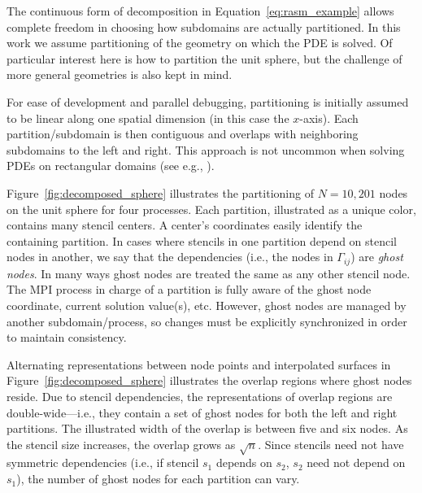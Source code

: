 \documentclass{report}
\begin{document}
The continuous form of decomposition in Equation~\ref{eq:rasm_example} allows complete freedom in choosing how subdomains are actually partitioned. In this work we assume partitioning of the geometry on which the PDE is solved. Of particular interest here is how to partition the unit sphere, but the challenge of more general geometries is also kept in mind. 

For ease of development and parallel debugging, partitioning is initially
assumed to be linear along one spatial dimension (in this case the $x$-axis). Each partition/subdomain is then contiguous and overlaps with neighboring subdomains to the left and right. This approach is not uncommon when solving PDEs on rectangular domains (see e.g., \cite{Divo2007, Thibault2009}). 


Figure~\ref{fig:decomposed_sphere} illustrates the partitioning of
$N=10,201$ nodes on the unit sphere for four processes. 
Each partition, illustrated as a unique color, contains many stencil centers.  
A center's coordinates easily identify the containing partition. In cases where stencils in one partition depend on stencil nodes in another, we say that the dependencies (i.e., the nodes in $\Gamma_{ij}$) are \emph{ghost nodes}. 
In many ways ghost nodes are treated the same as any other stencil node. The MPI process in charge of a partition is fully aware of the ghost node coordinate, current solution value(s), etc. However, ghost nodes are managed by another subdomain/process, so changes must be explicitly synchronized in order to maintain consistency. 

Alternating representations between node points and interpolated surfaces in Figure~\ref{fig:decomposed_sphere} illustrates the
overlap regions where ghost nodes reside. Due to stencil dependencies, the representations of overlap regions are double-wide---i.e., they contain a set of ghost nodes for both the left and right partitions. The illustrated width of the overlap is between five and six nodes. As the stencil size increases, the overlap grows as $\sqrt{n}$. Since stencils need not have symmetric dependencies (i.e., if stencil $s_1$ depends on $s_2$, $s_2$ need not depend on $s_1$), the number of ghost nodes for each partition can vary. 
\end{document}
